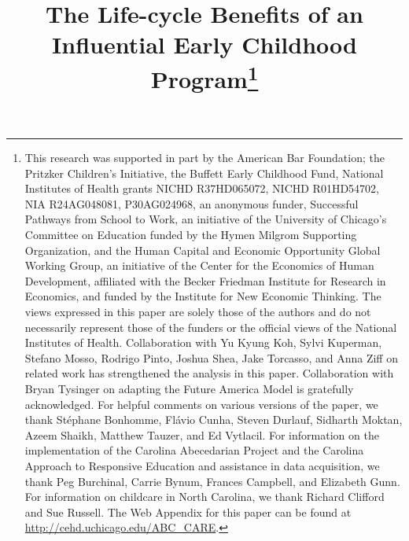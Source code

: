 


\newcommand*\leftright[2]{%
  \leavevmode
  \rlap{#1}%
  \hspace{0.5\linewidth}%
  #2}

\newcommand{\orth}{\ensuremath{\perp\!\!\!\perp}}%
\newcommand{\indep}{\orth}%
\newcommand{\notorth}{\ensuremath{\perp\!\!\!\!\!\!\diagup\!\!\!\!\!\!\perp}}%
\newcommand{\notindep}{\notorth}





\begin{titlepage}

\title{\Large \textbf{The Life-cycle Benefits of an Influential Early Childhood Program}\thanks{This research was supported in part by the American Bar Foundation; the Pritzker Children's Initiative, the Buffett Early Childhood Fund, National Institutes of Health grants NICHD R37HD065072, NICHD R01HD54702, NIA R24AG048081, P30AG024968, an anonymous funder, Successful Pathways from School to Work, an initiative of the University of Chicago's Committee on Education funded by the Hymen Milgrom Supporting Organization, and the Human Capital and Economic Opportunity Global Working Group, an initiative of the Center for the Economics of Human Development, affiliated with the Becker Friedman Institute for Research in Economics, and funded by the Institute for New Economic Thinking. The views expressed in this paper are solely those of the authors and do not necessarily represent those of the funders or the official views of the National Institutes of Health. Collaboration with Yu Kyung Koh, Sylvi Kuperman, Stefano Mosso, Rodrigo Pinto, Joshua Shea, Jake Torcasso, and Anna Ziff on related work has strengthened the analysis in this paper. Collaboration with Bryan Tysinger on adapting the Future America Model is gratefully acknowledged. For helpful comments on various versions of the paper, we thank St\'{e}phane Bonhomme, Fl\'{a}vio Cunha, Steven Durlauf, Sidharth Moktan, Azeem Shaikh, Matthew Tauzer, and Ed Vytlacil. For information on the implementation of the Carolina Abecedarian Project and the Carolina Approach to Responsive Education and assistance in data acquisition, we thank Peg Burchinal, Carrie Bynum, Frances Campbell, and Elizabeth Gunn. For information on childcare in North Carolina, we thank Richard Clifford and Sue Russell. The Web Appendix for this paper can be found at \url{http://cehd.uchicago.edu/ABC_CARE}.}}


\end{titlepage}
